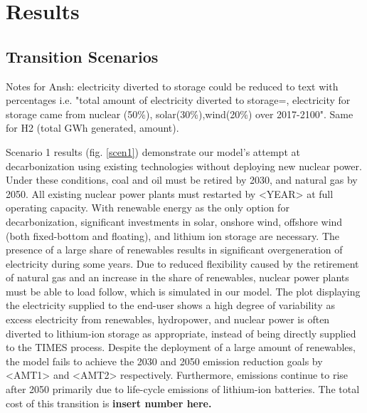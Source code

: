 \section{Results} \label{Results-and-discussion}
\subsection{Transition Scenarios}
Notes for Ansh: electricity diverted to storage could be reduced to text with percentages i.e. "total amount of electricity diverted to storage=, electricity for storage came from nuclear (50\%), solar(30\%),wind(20\%) over 2017-2100". Same for H2 (total GWh generated, amount).

Scenario 1 results (fig. \ref{scen1}) demonstrate our model's attempt at decarbonization using existing technologies without deploying new nuclear power. Under these conditions, coal and oil must be retired by 2030, and natural gas by 2050. All existing nuclear power plants must restarted by <YEAR> at full operating capacity. With renewable energy as the only option for decarbonization, significant investments in solar, onshore wind, offshore wind (both fixed-bottom and floating), and lithium ion storage are necessary. The presence of a large share of renewables results in significant overgeneration of electricity during some years. Due to reduced flexibility caused by the retirement of natural gas and an increase in the share of renewables, nuclear power plants must be able to load follow, which is simulated in our model. The plot displaying the electricity supplied to the end-user shows a high degree of variability as excess electricity from renewables, hydropower, and nuclear power is often diverted to lithium-ion storage as appropriate, instead of being directly supplied to the \gls{TIMES} process. Despite the deployment of a large amount of renewables, the model fails to achieve the 2030 and 2050 emission reduction goals by <AMT1> and <AMT2> respectively. Furthermore, emissions continue to rise after 2050 primarily due to life-cycle emissions of lithium-ion batteries. The total cost of this transition is \textbf{insert number here.}


